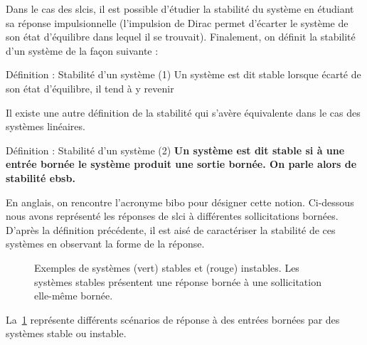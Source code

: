 Dans le cas des \glspl{slci}, il est possible d'étudier la stabilité du système 
en étudiant sa réponse impulsionnelle (l'impulsion de Dirac permet d'écarter 
le système de son état d'équilibre dans lequel il se trouvait). 
Finalement, on définit la stabilité d'un système de la façon 
suivante :
\begin{bdefinition}{Définition : Stabilité d'un système (1)}
Un système est dit stable lorsque écarté de son état d'équilibre, il 
tend à y revenir
\end{bdefinition}
Il existe une autre définition de la stabilité qui s'avère équivalente 
dans le cas des systèmes linéaires.
\begin{bdefinition}{Définition : Stabilité d'un système (2)}
\textbf{Un système est dit stable si à une entrée bornée le système produit 
une sortie bornée. On parle alors de stabilité \gls{ebsb}.}
\end{bdefinition}
En anglais, on rencontre l'acronyme \gls{bibo} pour désigner cette notion.
Ci-dessous nous avons représenté les réponses de \gls{slci} à différentes
sollicitations bornées. D'après la définition précédente, il est aisé
de caractériser la stabilité de ces systèmes en observant la forme de la 
réponse.
\begin{figure}[!t]
    \centering
    
    \caption{Exemples de systèmes (vert) stables et (rouge) instables. Les 
    systèmes stables présentent une réponse bornée à une sollicitation elle-même
    bornée.\label{fig-bibo}}
\end{figure}
La~\cref{fig-bibo} représente différents scénarios de réponse à des entrées 
bornées par des systèmes stable ou instable.
\newpage
